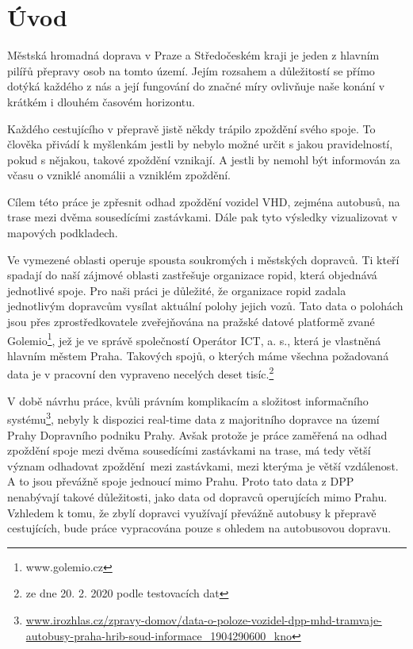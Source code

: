 \chapter*{Úvod}

Městská hromadná doprava v Praze a Středočeském kraji je jeden z hlavním pilířů přepravy osob na tomto území. Jejím rozsahem a důležitostí se přímo dotýká každého z nás a její fungování do značné míry ovlivňuje naše konání v krátkém i dlouhém časovém horizontu.

\bigbreak

Každého cestujícího v přepravě jistě někdy trápilo zpoždění svého spoje. To člověka přivádí k myšlenkám jestli by nebylo možné určit s jakou pravidelností, pokud s nějakou, takové zpoždění vznikají. A jestli by nemohl být informován za včasu o vzniklé anomálii a vzniklém zpoždění.

\bigbreak

Cílem této práce je zpřesnit odhad zpoždění vozidel VHD, zejména autobusů, na trase mezi dvěma sousedícími zastávkami. Dále pak tyto výsledky vizualizovat v mapových podkladech.

\bigbreak

Ve vymezené oblasti operuje spousta soukromých i městských dopravců. Ti kteří spadají do naší zájmové oblasti zastřešuje organizace \gls{ropid}, která objednává jednotlivé spoje. Pro naši práci je důležité, že organizace \gls{ropid} zadala jednotlivým dopravcům vysílat aktuální polohy jejich vozů. Tato data o polohách jsou přes zprostředkovatele zveřejňována na pražské datové platformě zvané Golemio\footnote{www.golemio.cz}, jež je ve správě společností Operátor ICT, a. s., která je vlastněná hlavním městem Praha.
Takových spojů, o kterých máme všechna požadovaná data je v pracovní den vypraveno necelých deset tisíc.\footnote{ze dne 20. 2. 2020 podle testovacích dat}

\bigbreak

V době návrhu práce, kvůli právním komplikacím a složitost informačního systému\footnote{\url{www.irozhlas.cz/zpravy-domov/data-o-poloze-vozidel-dpp-mhd-tramvaje-autobusy-praha-hrib-soud-informace_1904290600_kno}}, nebyly k dispozici real-time data z majoritního dopravce na území Prahy Dopravního podniku Prahy. Avšak protože je práce zaměřená na odhad zpoždění spoje mezi dvěma sousedícími zastávkami na trase, má tedy větší význam odhadovat zpoždění mezi zastávkami, mezi kterýma je větší vzdálenost. A to jsou převážně spoje jednoucí mimo Prahu. Proto tato data z DPP nenabývají takové důležitosti, jako data od dopravců operujících mimo Prahu. Vzhledem k tomu, že zbylí dopravci využívají převážně autobusy k přepravě cestujících, bude práce vypracována pouze s ohledem na autobusovou dopravu.


